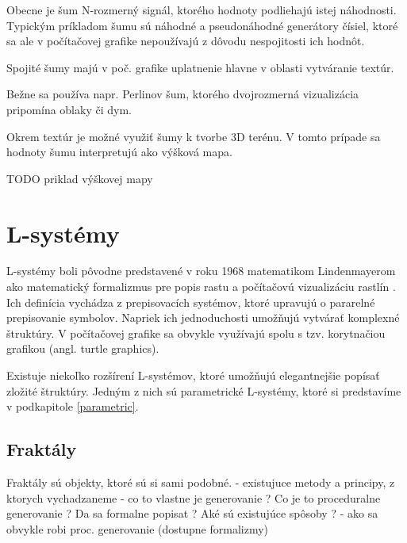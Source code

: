 Obecne je šum N-rozmerný signál, ktorého hodnoty podliehajú istej náhodnosti. Typickým príkladom šumu sú náhodné a pseudonáhodné generátory čísiel, ktoré sa ale v počítačovej grafike nepoužívajú z dôvodu nespojitosti ich hodnôt. 

Spojité šumy majú v poč. grafike uplatnenie hlavne v oblasti vytváranie textúr.

Bežne sa používa napr. Perlinov šum, ktorého dvojrozmerná vizualizácia pripomína oblaky či dym. 

Okrem textúr je možné využiť šumy k tvorbe 3D terénu. V tomto prípade sa hodnoty šumu interpretujú ako výšková mapa.

TODO priklad výškovej mapy

\section{L-systémy}
L-systémy boli pôvodne predstavené v roku 1968 matematikom Lindenmayerom ako matematický formalizmus pre popis rastu a počítačovú vizualizáciu rastlín \cite{Lsystems}.
Ich definícia vychádza z prepisovacích systémov, ktoré upravujú o pararelné prepisovanie symbolov.
Napriek ich jednoduchosti umožňujú vytvárať komplexné štruktúry. V počítačovej grafike sa obvykle využívajú spolu s tzv. korytnačiou grafikou (angl. turtle graphics).

Existuje niekoľko rozšírení L-systémov, ktoré umožňujú elegantnejšie popísať zložité štruktúry. Jedným z nich sú parametrické L-systémy, ktoré si predstavíme v podkapitole
\ref{parametric}.


\subsection{Fraktály}
Fraktály sú objekty, ktoré sú si sami podobné. 
	- existujuce metody a principy, z ktorych vychadzaneme
	- co to vlastne je generovanie ? Co je to proceduralne generovanie ?
		Da sa formalne popisat ? Aké sú existujúce spôsoby ?
	- ako sa obvykle robi proc. generovanie (dostupne formalizmy)
	

